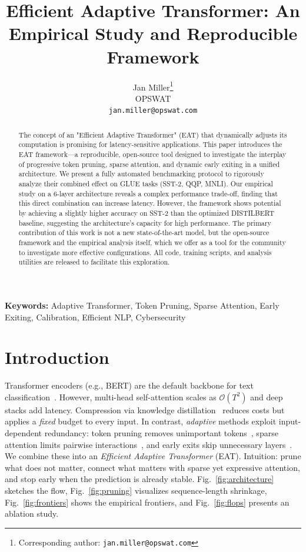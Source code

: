 \documentclass[11pt,letterpaper]{article}
\title{\textbf{Efficient Adaptive Transformer: An Empirical Study and Reproducible Framework}}
\author{
  Jan Miller\thanks{Corresponding author: \texttt{jan.miller@opswat.com}} \\
  \small OPSWAT \\
  \small \texttt{jan.miller@opswat.com}
}
\date{}
\theoremstyle{plain}
\newcommand{\eat}{\textsc{EAT}}
\newcommand{\bert}{\textsc{BERT}}
\begin{document}
\maketitle

\begin{abstract}
The concept of an "Efficient Adaptive Transformer" (EAT) that dynamically adjusts its computation is promising for latency-sensitive applications. This paper introduces the EAT framework---a reproducible, open-source tool designed to investigate the interplay of progressive token pruning, sparse attention, and dynamic early exiting in a unified architecture. We present a fully automated benchmarking protocol to rigorously analyze their combined effect on GLUE tasks (SST-2, QQP, MNLI). Our empirical study on a 6-layer architecture reveals a complex performance trade-off, finding that this direct combination can increase latency. However, the framework shows potential by achieving a slightly higher accuracy on SST-2 than the optimized DISTILBERT baseline, suggesting the architecture's capacity for high performance. The primary contribution of this work is not a new state-of-the-art model, but the open-source framework and the empirical analysis itself, which we offer as a tool for the community to investigate more effective configurations. All code, training scripts, and analysis utilities are released to facilitate this exploration.
\end{abstract}

\noindent\textbf{Keywords:} Adaptive Transformer, Token Pruning, Sparse Attention, Early Exiting, Calibration, Efficient NLP, Cybersecurity

\section{Introduction}
Transformer encoders (e.g., \bert{}) are the default backbone for text classification~\citep{devlin2019bert,vaswani2017attention}.
However, multi-head self-attention scales as $\mathcal{O}(T^2)$ and deep stacks add latency.
Compression via knowledge distillation~\citep{hinton2015distill,sanh2019distilbert,turc2019wellread} reduces costs but applies a \emph{fixed} budget to every input.
In contrast, \emph{adaptive} methods exploit input-dependent redundancy: token pruning removes unimportant tokens~\citep{goyal2020powerbert,kim2021learned}, sparse attention limits pairwise interactions~\citep{zaheer2020bigbird,beltagy2020longformer,wang2020linformer,choromanski2021performer,kitaev2020reformer}, and early exits skip unnecessary layers~\citep{xin2020deebert,zhou2020bert}.
We combine these into an \emph{Efficient Adaptive Transformer} (\eat{}). Intuition: prune what does not matter, connect what matters with sparse yet expressive attention, and stop early when the prediction is already stable.
Fig.~\ref{fig:architecture} sketches the flow, Fig.~\ref{fig:pruning} visualizes sequence-length shrinkage, Fig.~\ref{fig:frontiers} shows the empirical frontiers, and Fig.~\ref{fig:flops} presents an ablation study.
\end{document}
